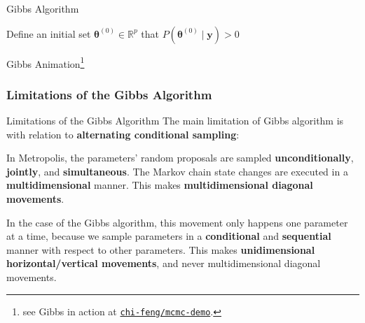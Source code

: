 \begin{frame}[fragile]{Gibbs Algorithm}
	\SetAlCapFnt{\normalsize}
	\SetAlCapNameFnt{\normalsize}
	\begin{algorithm}[H]
		\DontPrintSemicolon
		\SetAlgoNoEnd
		\SetAlgoLined
		Define an initial set $\boldsymbol{\theta}^{(0)} \in \mathbb{R}^p$ that $P\left(\boldsymbol{\theta}^{(0)} \mid \mathbf{y} \right) > 0$\;
		\caption{Gibbs}
	\end{algorithm}
\end{frame}

\begin{frame}{Gibbs Animation\footnote{see Gibbs in action at \href{https://chi-feng.github.io/mcmc-demo/app.html?algorithm=GibbsSampling&target=banana}{\texttt{chi-feng/mcmc-demo}}.}}
	\centering
\end{frame}

\subsubsection{Limitations of the Gibbs Algorithm}
\begin{frame}{Limitations of the Gibbs Algorithm}
	The main limitation of Gibbs algorithm is with relation to
	\textbf{alternating conditional sampling}:
	\begin{vfilleditems}
		\item In Metropolis, the parameters' random proposals are sampled
		\textbf{unconditionally}, \textbf{jointly}, and \textbf{simultaneous}.
		The Markov chain state changes are executed in a
		\textbf{multidimensional} manner.
		This makes \textbf{multidimensional diagonal movements}.
		\item In the case of the Gibbs algorithm,
		this movement only happens one parameter at a time,
		because we sample parameters in a
		\textbf{conditional} and \textbf{sequential} manner with respect
		to other parameters.
		This makes \textbf{unidimensional horizontal/vertical movements},
		and never multidimensional diagonal movements.
	\end{vfilleditems}
\end{frame}

